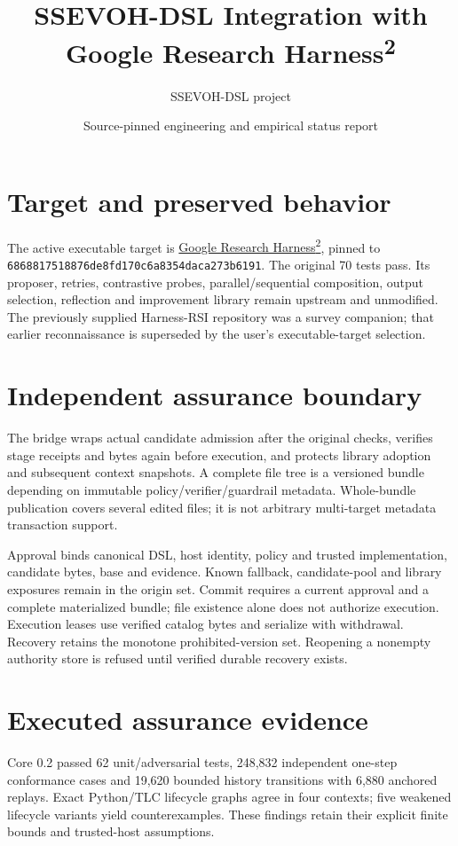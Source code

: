 \documentclass[11pt]{article}
\title{SSEVOH-DSL Integration with Google Research Harness\textsuperscript{2}}
\author{SSEVOH-DSL project}
\date{Source-pinned engineering and empirical status report}
\begin{document}
\maketitle
\section{Target and preserved behavior}
The active executable target is \href{https://github.com/google-research/harness2/tree/6868817518876de8fd170c6a8354daca273b6191}{Google Research Harness\textsuperscript{2}}, pinned to \texttt{6868817518876de8fd170c6a8354daca273b6191}. The original 70 tests pass. Its proposer, retries, contrastive probes, parallel/sequential composition, output selection, reflection and improvement library remain upstream and unmodified. The previously supplied Harness-RSI repository was a survey companion; that earlier reconnaissance is superseded by the user's executable-target selection.

\section{Independent assurance boundary}
The bridge wraps actual candidate admission after the original checks, verifies stage receipts and bytes again before execution, and protects library adoption and subsequent context snapshots. A complete file tree is a versioned bundle depending on immutable policy/verifier/guardrail metadata. Whole-bundle publication covers several edited files; it is not arbitrary multi-target metadata transaction support.

Approval binds canonical DSL, host identity, policy and trusted implementation, candidate bytes, base and evidence. Known fallback, candidate-pool and library exposures remain in the origin set. Commit requires a current approval and a complete materialized bundle; file existence alone does not authorize execution. Execution leases use verified catalog bytes and serialize with withdrawal. Recovery retains the monotone prohibited-version set. Reopening a nonempty authority store is refused until verified durable recovery exists.

\section{Executed assurance evidence}
Core 0.2 passed 62 unit/adversarial tests, 248,832 independent one-step conformance cases and 19,620 bounded history transitions with 6,880 anchored replays. Exact Python/TLC lifecycle graphs agree in four contexts; five weakened lifecycle variants yield counterexamples. These findings retain their explicit finite bounds and trusted-host assumptions.
\end{document}
